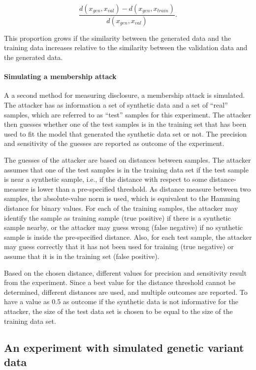 \documentclass[12pt]{article}
\begin{document}
\begin{equation}
\frac{d(x_{gen}, x_{val}) - d(x_{gen}, x_{train})}{d(x_{gen}, x_{val})}.
\end{equation}

This proportion grows if the similarity  between the generated data and the training data increases relative to the similarity between the validation data and the generated data.

\paragraph{Simulating a membership attack}\label{membershipattack}
A a second method for measuring disclosure, a membership attack \citep{choi_generating_2017, goncalves} is simulated. 
The attacker has as information a set of synthetic data and a set of ``real'' samples, which are referred to as ``test'' samples for this experiment.
The attacker then guesses whether one of the test samples is in the training set that has been used to fit the model that generated the synthetic data set or not.
The precision and sensitivity of the guesses are reported as outcome of the experiment.

The guesses of the attacker are based on distances between samples.
The attacker assumes that one of the test samples is in the training data set if the test sample is near a synthetic sample, i.e., if the distance with respect to some distance-measure is lower than a pre-specified threshold.
As distance measure between two samples, the absolute-value norm is used, which is equivalent to the Hamming distance for binary values.
For each of the training samples, the attacker may identify the sample as training sample (true positive) if there is a synthetic sample nearby, or the attacker may guess wrong (false negative) if no synthetic sample is inside the pre-specified distance.
Also, for each test sample, the attacker may guess correctly that it has not been used for training (true negative) or assume that it is in the training set (false positive).

Based on the chosen distance, different values for precision and sensitivity result from the experiment.
Since a best value for the distance threshold cannot be determined, different distances are used, and multiple outcomes are reported.
To have a value as 0.5 as outcome if the synthetic data is not informative for the attacker, the size of the test data set is chosen to be equal to the size of the training data set.

\subsection{An experiment with simulated genetic variant data}\label{simuexp}
 
\end{document}
